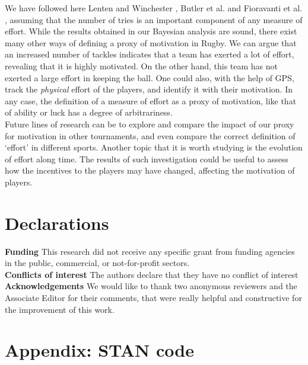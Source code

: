 \documentclass[]{article}
\begin{document}
We have followed here Lenten and Winchester \cite{lenten2015secondary}, Butler et al. \cite{butler2020bonus} and Fioravanti et al. \cite{fioravanti2021effort}, assuming that the number of tries is an important component of any measure of effort. While the results obtained in our Bayesian analysis are sound, there exist many other ways of defining a proxy of motivation in Rugby. We can argue that an increased number of tackles indicates that a team has exerted a lot of effort, revealing that it is highly motivated. On the other hand, this team has not exerted a large effort in keeping the ball. One could also, with the help of GPS, track the {\em physical} effort of the players, and identify it with their motivation. In any case, the definition of a measure of effort as a proxy of motivation, like that of ability or luck has a degree of arbitrariness. \\

Future lines of research can be to explore and compare the impact of our proxy for motivation in other tournaments, and even compare the correct definition of  `effort' in different sports. Another topic that it is worth studying is the evolution of effort along time. The results of such investigation could be useful to assess how the incentives to the players may have changed, affecting the motivation of players. \\
\section*{Declarations}
\noindent\textbf{Funding} This research did not receive any specific grant from funding agencies in the public, commercial, or not-for-profit sectors.\\
\noindent\textbf{Conflicts of interest} The authors declare that they have no conflict of interest\\
\noindent\textbf{Acknowledgements} We would like to thank two anonymous reviewers and the Associate Editor for their comments, that were really helpful and constructive for the improvement of this work.
%





\newpage



\section*{Appendix: STAN code}
\end{document}
